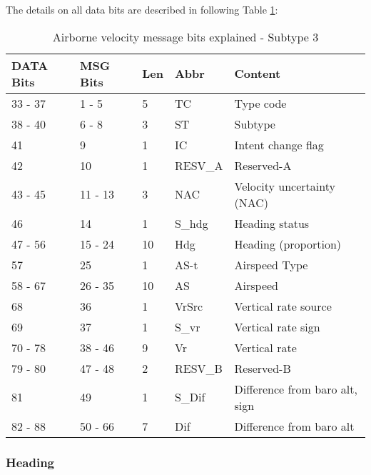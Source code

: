 The details on all data bits are described in following Table \ref{tb:adsb-v-bits-st-3}:

\begin{table}[]
\centering
\caption{Airborne velocity message bits explained - Subtype 3}
\label{tb:adsb-v-bits-st-3}
\begin{tabular}{@{}lllll@{}}
\toprule
DATA Bits  & MSG Bits   & Len  & Abbr    & Content                        \\ \midrule
33 - 37    & 1 - 5      &  5   & TC      & Type code                      \\
38 - 40    & 6 - 8      &  3   & ST      & Subtype                        \\
41         & 9          &  1   & IC      & Intent change flag             \\
42         & 10         &  1   & RESV\_A & Reserved-A                     \\
43 - 45    & 11 - 13    &  3   & NAC     & Velocity uncertainty (NAC)     \\
46         & 14         &  1   & S\_hdg  & Heading status                 \\
47 - 56    & 15 - 24    &  10  & Hdg     & Heading (proportion)           \\
57         & 25         &  1   & AS-t    & Airspeed Type                  \\
58 - 67    & 26 - 35    &  10  & AS      & Airspeed                       \\
68         & 36         &  1   & VrSrc   & Vertical rate source           \\
69         & 37         &  1   & S\_vr   & Vertical rate sign             \\
70 - 78    & 38 - 46    &  9   & Vr      & Vertical rate                  \\
79 - 80    & 47 - 48    &  2   & RESV\_B & Reserved-B                     \\
81         & 49         &  1   & S\_Dif  & Difference from baro alt, sign \\
82 - 88    & 50 - 66    &  7   & Dif     & Difference from baro alt       \\ \bottomrule
\end{tabular}
\end{table}

\subsubsection{Heading}\label{heading}

